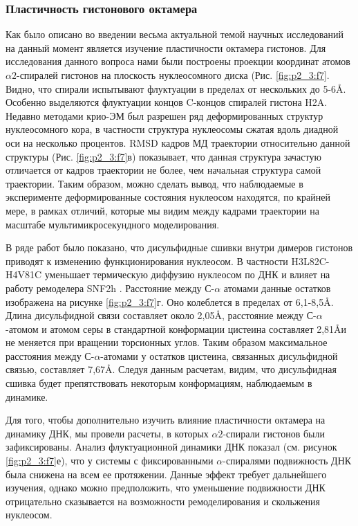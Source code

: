 \subsubsection{Пластичность гистонового октамера}

Как было описано во введении весьма актуальной темой научных исследований на данный момент является изучение пластичности октамера гистонов. Для исследования данного вопроса нами были построены проекции координат атомов $\alpha 2$-спиралей гистонов на плоскость нуклеосомного диска (Рис. \ref{fig:p2_3:f7}. Видно, что спирали испытывают флуктуации в пределах от нескольких до 5-6\AA. Особенно выделяются флуктуации концов C-концов спиралей гистона H2A. Недавно методами крио-ЭМ был разрешен ряд деформированных структур нуклеосомного кора, в частности структура нуклеосомы сжатая вдоль диадной оси на несколько процентов. RMSD кадров  МД траектории относительно данной структуры (Рис. \ref{fig:p2_3:f7}в) показывает, что данная структура зачастую отличается от кадров траектории не более, чем начальная структура самой траектории. Таким образом, можно сделать вывод, что наблюдаемые в эксперименте деформированные состояния нуклеосом находятся, по крайней мере, в рамках отличий, которые мы видим между кадрами траектории на масштабе мультимикросекундного моделирования.

В ряде работ было показано, что дисульфидные сшивки внутри димеров гистонов приводят к изменению функционирования нуклеосом. В частности H3L82C-H4V81C уменьшает термическую диффузию нуклеосом по ДНК и влияет на работу ремоделера SNF2h \cite{bilokapic_histone_2018,bilokapic_structural_2018,sinha_distortion_2017}. Расстояние между С-$\alpha$ атомами данные остатков изображена на рисунке \ref{fig:p2_3:f7}г. Оно колеблется в пределах от 6,1-8,5\AA. Длина дисульфидной связи составляет около 2,05\AA, расстояние между С-$\alpha$-атомом и атомом серы в стандартной конформации цистеина составляет 2,81\AA и не меняется при вращении торсионных углов. Таким образом максимальное расстояния между С-$\alpha$-атомами у остатков цистеина, связанных дисульфидной связью, составляет 7,67\AA. Следуя данным расчетам, видим, что дисульфидная сшивка будет препятствовать некоторым конформациям, наблюдаемым в динамике.

Для того, чтобы дополнительно изучить влияние пластичности октамера на динамику ДНК, мы провели расчеты, в которых $\alpha 2$-спирали гистонов были зафиксированы. Анализ флуктуационной динамики ДНК показал (см. рисунок \ref{fig:p2_3:f7}е), что у системы с фиксированными $\alpha$-спиралями подвижность ДНК была снижена на всем ее протяжении. Данные эффект требует дальнейшего изучения, однако можно предположить, что уменьшение подвижности ДНК отрицательно сказывается на возможности ремоделирования и скольжения нуклеосом.



